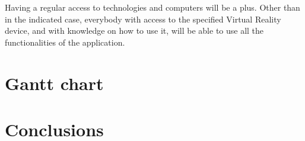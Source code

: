 \documentclass[11pt,a4paper]{article}
\begin{document}
Having a regular access to technologies and computers will be a plus. 
Other than in the indicated case, everybody with access to the specified Virtual Reality device, and with knowledge on how to use it, will be able to use all the functionalities of the application.





\section{Gantt chart}

\section{Conclusions}
\end{document}
